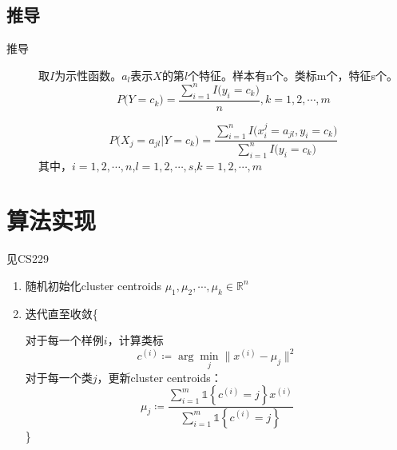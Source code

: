 \documentclass{ctexart}
\begin{document}
\subsection{推导}
\label{derivations}
\begin{description}
\item[推导]
取$I$为示性函数。$a_l$表示$X$的第$l$个特征。样本有n个。类标m个，特征s个。
\begin{equation}
P\big(Y=c_k\big)=\frac{\sum\limits_{i=1}^{n}I\big(y_i=c_k\big)}{n},k=1,2,\cdots,m
\end{equation}

\begin{equation}
P\big(X_j=a_{jl}|Y=c_k\big)=\frac{\sum\limits_{i=1}^{n}I\big(x_i^j=a_{jl},y_i=c_k\big)}{\sum\limits_{i=1}^{n}I\big(y_i=c_k\big)}
\end{equation}
其中，$i=1,2,\cdots,n$,$l=1,2,\cdots,s$,$k=1,2,\cdots,m$
\end{description}


\section{算法实现}
见CS229\cite{stanf:cs229}
%
\begin{enumerate}[1.]
\item 随机初始化cluster centroids $\mu_1,\mu_2,\cdots,\mu_k\in\mathbb{R}^n$
\item 迭代直至收敛\{

对于每一个样例$i$，计算类标
\begin{equation}
c^{\left(i\right)}\coloneqq \arg\min\limits_{j}\big\| x^{\left(i\right)}-\mu_{j}\big\|^2
\end{equation}
对于每一个类$j$，更新cluster centroids：
\begin{equation}
\mu_j \coloneqq \frac{\sum\limits_{i=1}^{m}\mathds{1}\left\{c^{\left(i\right)}=j\right\}x^{\left(i\right)}}{\sum\limits_{i=1}^{m}\mathds{1}\left\{c^{\left(i\right)}=j\right\}}
\end{equation}
\}
\end{enumerate}

%
\end{document}
